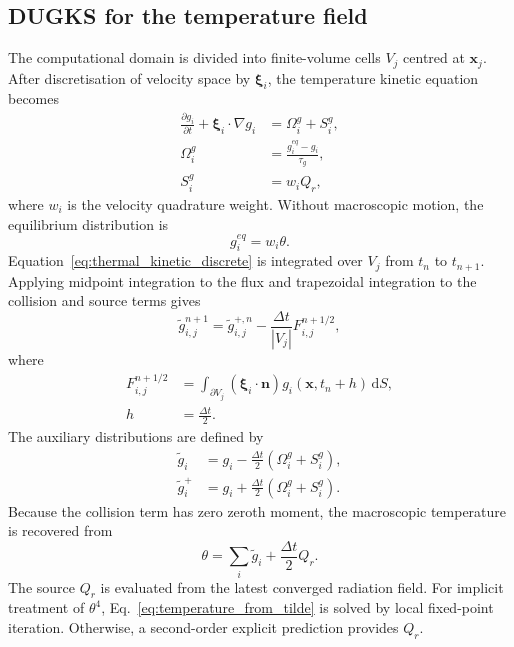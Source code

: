 \documentclass[a4paper,12pt]{ctexart}
\numberwithin{equation}{section}
\newcommand{\vb}[1]{\bm{#1}}
\newcommand{\vx}{\vb{x}}
\newcommand{\vn}{\vb{n}}
\newcommand{\vxi}{\bm{\xi}}
\newcommand{\dd}{\mathrm{d}}
\begin{document}
\subsection{DUGKS for the temperature field}
\label{subsec:temperature_dugks}

The computational domain is divided into finite-volume cells $V_j$ centred at $\vx_j$. After discretisation of velocity space by $\vxi_i$, the temperature kinetic equation becomes
\begin{equation}
\begin{aligned}
\frac{\partial g_i}{\partial t}+\vxi_i\cdot\nabla g_i&=\Omega_i^g+S_i^g,
\\
\Omega_i^g&=\frac{g_i^{eq}-g_i}{\tau_g},
\\
S_i^g&=w_i Q_r,
\end{aligned}
\label{eq:thermal_kinetic_discrete}
\end{equation}
where $w_i$ is the velocity quadrature weight. Without macroscopic motion, the equilibrium distribution is
\begin{equation*}
g_i^{eq}=w_i\theta.
\end{equation*}
Equation~\eqref{eq:thermal_kinetic_discrete} is integrated over $V_j$ from $t_n$ to $t_{n+1}$. Applying midpoint integration to the flux and trapezoidal integration to the collision and source terms gives
\begin{equation}
\tilde g_{i,j}^{n+1}=\tilde g_{i,j}^{+,n}-\frac{\Delta t}{|V_j|}F_{i,j}^{n+1/2},
\label{eq:g_update}
\end{equation}
where
\begin{equation}
\begin{aligned}
F_{i,j}^{n+1/2}&=\int_{\partial V_j}(\vxi_i\cdot\vn)g_i(\vx,t_n+h)\,\dd S,
\\
h&=\frac{\Delta t}{2}.
\end{aligned}
\label{eq:g_flux}
\end{equation}
The auxiliary distributions are defined by
\begin{equation*}
\begin{aligned}
\tilde g_i&=g_i-\frac{\Delta t}{2}\left(\Omega_i^g+S_i^g\right),
\\
\tilde g_i^+&=g_i+\frac{\Delta t}{2}\left(\Omega_i^g+S_i^g\right).
\end{aligned}
\end{equation*}
Because the collision term has zero zeroth moment, the macroscopic temperature is recovered from
\begin{equation}
\theta=\sum_i\tilde g_i+\frac{\Delta t}{2}Q_r.
\label{eq:temperature_from_tilde}
\end{equation}
The source $Q_r$ is evaluated from the latest converged radiation field. For implicit treatment of $\theta^4$, Eq.~\eqref{eq:temperature_from_tilde} is solved by local fixed-point iteration. Otherwise, a second-order explicit prediction provides $Q_r$.
\end{document}
